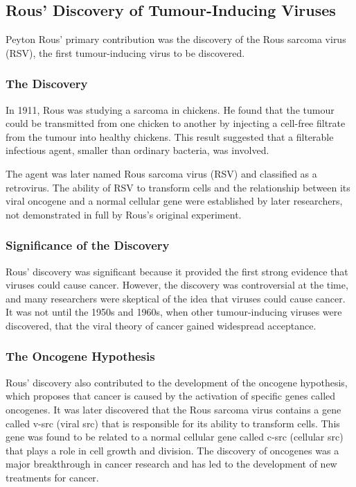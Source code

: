 \subsection{Rous' Discovery of Tumour-Inducing Viruses}

Peyton Rous' primary contribution was the discovery of the Rous sarcoma virus (RSV), the first tumour-inducing virus to be discovered.

\subsubsection{The Discovery}

In 1911, Rous was studying a sarcoma in chickens. He found that the tumour could be transmitted from one chicken to another by injecting a cell-free filtrate from the tumour into healthy chickens. This result suggested that a filterable infectious agent, smaller than ordinary bacteria, was involved.

The agent was later named Rous sarcoma virus (RSV) and classified as a retrovirus. The ability of RSV to transform cells and the relationship between its viral oncogene and a normal cellular gene were established by later researchers, not demonstrated in full by Rous's original experiment.

\subsubsection{Significance of the Discovery}

Rous' discovery was significant because it provided the first strong evidence that viruses could cause cancer. However, the discovery was controversial at the time, and many researchers were skeptical of the idea that viruses could cause cancer. It was not until the 1950s and 1960s, when other tumour-inducing viruses were discovered, that the viral theory of cancer gained widespread acceptance.

\subsubsection{The Oncogene Hypothesis}

Rous' discovery also contributed to the development of the oncogene hypothesis, which proposes that cancer is caused by the activation of specific genes called oncogenes. It was later discovered that the Rous sarcoma virus contains a gene called v-src (viral src) that is responsible for its ability to transform cells. This gene was found to be related to a normal cellular gene called c-src (cellular src) that plays a role in cell growth and division. The discovery of oncogenes was a major breakthrough in cancer research and has led to the development of new treatments for cancer.

